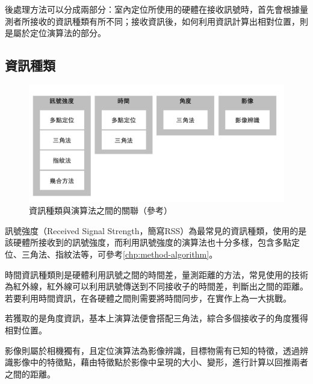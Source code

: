     後處理方法可以分成兩部分：室內定位所使用的硬體在接收訊號時，首先會根據量測者所接收的資訊種類有所不同；接收資訊後，如何利用資訊計算出相對位置，則是屬於定位演算法的部分。
    
    

    \subsection{資訊種類}
    
    \begin{figure}[h]
        \centering
        \includegraphics[width=12cm]{ch2pic/method_sort.png}
        \caption{資訊種類與演算法之間的關聯（參考\cite{survey_light2018}）}
        \label{pic:method_sort}
    \end{figure}

    訊號強度（Received Signal Strength，簡寫RSS）為最常見的資訊種類\cite{survey_indoor2018}，使用的是該硬體所接收到的訊號強度，而利用訊號強度的演算法也十分多樣，包含多點定位、三角法、指紋法等，可參考\ref{chp:method-algorithm}。

    時間資訊種類則是硬體利用訊號之間的時間差，量測距離的方法，常見使用的技術為紅外線，紅外線可以利用訊號傳送到不同接收子的時間差，判斷出之間的距離。若要利用時間資訊，在各硬體之間則需要將時間同步，在實作上為一大挑戰\cite{survey_indoor2014}。

    若獲取的是角度資訊，基本上演算法便會搭配三角法，綜合多個接收子的角度獲得相對位置。

    影像則屬於相機獨有，且定位演算法為影像辨識，目標物需有已知的特徵，透過辨識影像中的特徵點，藉由特徵點於影像中呈現的大小、變形，進行計算以回推兩者之間的距離。


